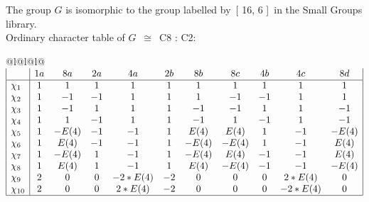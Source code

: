 \documentclass[varwidth=\maxdimen,border=10]{standalone}
\begin{document}
The group $G$ is isomorphic to the group labelled by\ [ 16, 6 ]\ in the Small Groups library.\\
Ordinary character table of $G$\ $\cong$\ C8 : C2:\\
\begin{center}
\begin{tabular}{@{}l@{}l@{}l@{}}
\hline
\(\begin{array}{|l|cccccccccc|}
  & 1a & 8a & 2a & 4a & 2b & 8b & 8c & 4b & 4c & 8d\\ \hline
\chi_{1} & 1 & 1 & 1 & 1 & 1 & 1 & 1 & 1 & 1 & 1\\
\chi_{2} & 1 & -1 & -1 & 1 & 1 & 1 & -1 & -1 & 1 & 1\\
\chi_{3} & 1 & -1 & 1 & 1 & 1 & -1 & -1 & 1 & 1 & -1\\
\chi_{4} & 1 & 1 & -1 & 1 & 1 & -1 & 1 & -1 & 1 & -1\\
\chi_{5} & 1 & -E(4) & -1 & -1 & 1 & E(4) & E(4) & 1 & -1 & -E(4)\\
\chi_{6} & 1 & E(4) & -1 & -1 & 1 & -E(4) & -E(4) & 1 & -1 & E(4)\\
\chi_{7} & 1 & -E(4) & 1 & -1 & 1 & -E(4) & E(4) & -1 & -1 & E(4)\\
\chi_{8} & 1 & E(4) & 1 & -1 & 1 & E(4) & -E(4) & -1 & -1 & -E(4)\\
\chi_{9} & 2 & 0 & 0 & -2*E(4) & -2 & 0 & 0 & 0 & 2*E(4) & 0\\
\chi_{10} & 2 & 0 & 0 & 2*E(4) & -2 & 0 & 0 & 0 & -2*E(4) & 0\\
\hline
\end{array}\)\\
\end{tabular}
\end{center}
\end{document}

